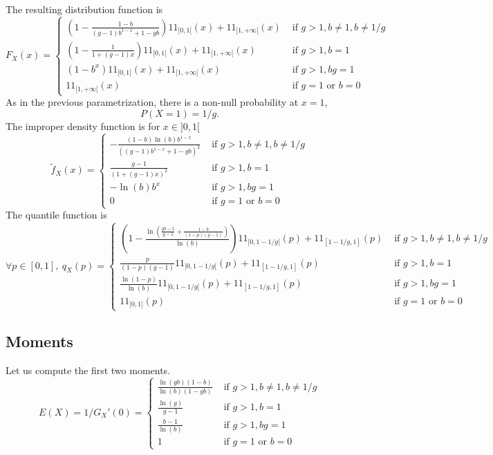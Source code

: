 \documentclass[article, nojss]{jss}
\newcommand{\ind}{1\!\!1}
\newcommand{\systL}{\left\{\begin{array}{ll}}
\newcommand{\systR}{\end{array}\right.}
\begin{document}
The resulting distribution function is
\begin{equation}
F_X(x)=
\systL
\left(1- \frac{1-b}{(g-1)b^{1-x}+1-gb}\right)\ind_{[0,1[}(x) + \ind_{[1,+\infty[}(x) & \text{ if } g>1, b\neq 1, b\neq 1/g \\
\left(1- \frac{1}{1+(g-1)x}\right)\ind_{[0,1[}(x) + \ind_{[1,+\infty[}(x) & \text{ if } g>1, b= 1 \\
(1-b^x)\ind_{[0,1[}(x) + \ind_{[1,+\infty[}(x) & \text{ if } g>1, bg= 1 \\
\ind_{[1,+\infty[}(x) & \text{ if } g=1 \text{ or } b= 0
\systR
\label{cdf:mbbefd:gb}
\end{equation}
As in the previous parametrization, there is a non-null probability at $x=1$, 
\begin{equation}
P(X=1)  = 1/g.
\label{mass0:mbbefd:gb}
\end{equation}
The improper density function is for $x\in ]0,1[$
\begin{equation}
\tilde f_X(x) = 
\systL
- \frac{(1-b)\ln(b)b^{1-x}}{((g-1)b^{1-x}+1-gb)^2}  & \text{ if } g>1, b\neq 1, b\neq 1/g \\
\frac{g-1}{(1+(g-1)x)^2} & \text{ if } g>1, b= 1 \\
-\ln(b) b^x  & \text{ if } g>1, bg= 1 \\
0 & \text{ if } g=1 \text{ or } b= 0
\systR
\label{impd:mbbefd:gb}
\end{equation}
The quantile function is 
\begin{equation}
\forall p\in [0,1],~
q_X(p) = 
\systL
\left(1-\frac{\ln\left(\frac{gb-1}{g-1} +\frac{1-b}{(1-p)(g-1)}\right)}{\ln(b)}  \right)
\ind_{[0,1-1/g[}(p) + \ind_{[1-1/g,1]}(p) & \text{ if } g>1, b\neq 1, b\neq 1/g \\
\frac{p}{(1-p)(g-1)}\ind_{[0,1-1/g[}(p) + \ind_{[1-1/g,1]}(p)  & \text{ if } g>1, b= 1 \\
\frac{\ln(1-p)}{\ln(b)}\ind_{[0,1-1/g[}(p) + \ind_{[1-1/g,1]}(p) & \text{ if }  g>1, bg= 1 \\
\ind_{]0,1]}(p) & \text{ if } g=1 \text{ or } b= 0
\systR
\label{q:mbbefd:gb}
\end{equation}


\subsection{Moments}
Let us compute the first two moments.
$$
E(X) = 1/G_X'(0) = 
\systL
\frac{\ln(gb)(1-b)}{\ln(b)(1-gb)} & \text{ if } g>1, b\neq 1, b\neq 1/g \\
\frac{\ln(g)}{g-1}  & \text{ if } g>1, b= 1 \\
\frac{b-1}{\ln(b)} & \text{ if }  g>1, bg= 1 \\
1 & \text{ if } g=1 \text{ or } b= 0
\systR
$$
\end{document}
